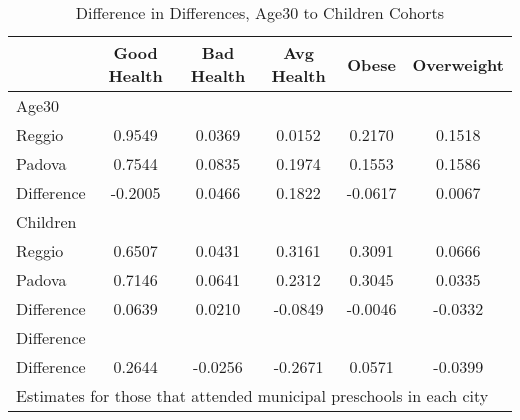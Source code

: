 \begin{table}[htbp]\centering
\caption{Difference in Differences, Age30 to Children Cohorts}
\begin{tabular}{l*{5}{c}}
\hline\hline
            & Good Health&  Bad Health&  Avg Health&       Obese&  Overweight\\
\hline
Age30       &            &            &            &            &            \\
Reggio      &      0.9549&      0.0369&      0.0152&      0.2170&      0.1518\\
Padova      &      0.7544&      0.0835&      0.1974&      0.1553&      0.1586\\
Difference  &     -0.2005&      0.0466&      0.1822&     -0.0617&      0.0067\\
\hline
Children    &            &            &            &            &            \\
Reggio      &      0.6507&      0.0431&      0.3161&      0.3091&      0.0666\\
Padova      &      0.7146&      0.0641&      0.2312&      0.3045&      0.0335\\
Difference  &      0.0639&      0.0210&     -0.0849&     -0.0046&     -0.0332\\
\hline
Difference  &            &            &            &            &            \\
Difference  &      0.2644&     -0.0256&     -0.2671&      0.0571&     -0.0399\\
\hline\hline
\multicolumn{6}{l}{\footnotesize Estimates for those that attended municipal preschools in each city}\\
\end{tabular}
\end{table}
